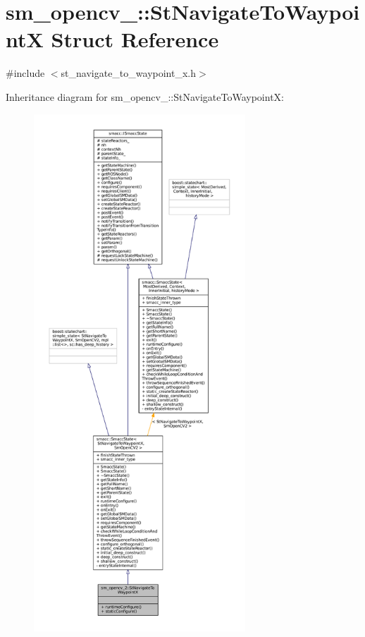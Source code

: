 \hypertarget{structsm__opencv__2_1_1StNavigateToWaypointX}{}\section{sm\+\_\+opencv\+\_\+:\+:St\+Navigate\+To\+WaypointX Struct Reference}
\label{structsm__opencv__2_1_1StNavigateToWaypointX}


{\ttfamily \#include $<$st\+\_\+navigate\+\_\+to\+\_\+waypoint\+\_\+x.\+h$>$}



Inheritance diagram for sm\+\_\+opencv\+\_\+:\+:St\+Navigate\+To\+WaypointX\+:
\nopagebreak
\begin{figure}[H]
\begin{center}
\leavevmode
\includegraphics[height=550pt]{structsm__opencv__2_1_1StNavigateToWaypointX__inherit__graph}
\end{center}
\end{figure}


